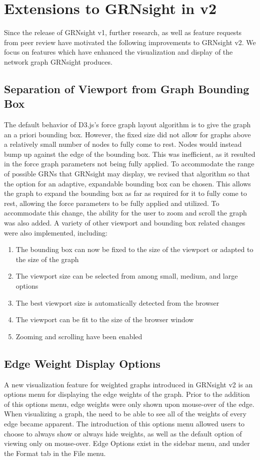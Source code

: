 \documentclass[sigconf,review]{acmart}
\begin{document}
\section{Extensions to GRNsight in v2}
Since the release of GRNsight v1, further research, as well as feature requests from peer review have motivated the following improvements to GRNsight v2. We focus on features which have enhanced the visualization and display of the network graph GRNsight produces.

\subsection{Separation of Viewport from Graph Bounding Box}

The default behavior of D3.js's force graph layout algorithm is to give the graph an a priori bounding box. However, the fixed size did not allow for graphs above a relatively small number of nodes to fully come to rest. Nodes would instead bump up against the edge of the bounding box. This was inefficient, as it resulted in the force graph parameters not being fully applied. To accommodate the range of possible GRNs that GRNsight may display, we revised that algorithm so that the option for an adaptive, expandable bounding box can be chosen. This allows the graph to expand the bounding box as far as required for it to fully come to rest, allowing the force parameters to be fully applied and utilized. To accommodate this change, the ability for the user to zoom and scroll the graph was also added. A variety of other viewport and bounding box related changes were also implemented, including:

\begin{enumerate}
  \item The bounding box can now be fixed to the size of the viewport or adapted to the size of the graph
  \item The viewport size can be selected from among small, medium, and large options
  \item The best viewport size is automatically detected from the browser
  \item The viewport can be fit to the size of the browser window 
  \item Zooming and scrolling have been enabled
\end{enumerate}

\subsection{Edge Weight Display Options}
A new visualization feature for weighted graphs introduced in GRNsight v2 is an options menu for displaying the edge weights of the graph. Prior to the addition of this options menu, edge weights were only shown upon mouse-over of the edge. When visualizing a graph, the need to be able to see all of the weights of every edge became apparent. The introduction of this options menu allowed users to choose to always show or always hide weights, as well as the default option of viewing only on mouse-over. Edge Options exist in the sidebar menu, and under the Format tab in the File menu.
\end{document}
